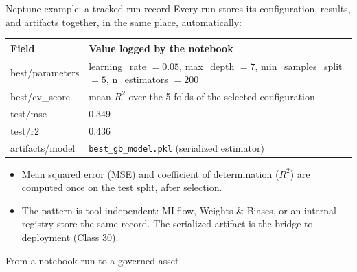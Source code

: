 \begin{frame}{Neptune example: a tracked run record}
\begingroup\footnotesize
Every run stores its configuration, results, and artifacts together, in the same place, automatically:
\par\endgroup
\vspace{0.4em}
\centering
\begingroup\footnotesize
\renewcommand{\arraystretch}{1.2}
\begin{tabularx}{0.9\textwidth}{>{\ttfamily}l X}
\normalfont\bfseries Field & \bfseries Value logged by the notebook \\
\toprule
best/parameters & learning\_rate $= 0.05$, max\_depth $= 7$, min\_samples\_split $= 5$, n\_estimators $= 200$ \\
best/cv\_score & mean $R^2$ over the 5 folds of the selected configuration \\
test/mse & 0.349 \\
test/r2 & 0.436 \\
artifacts/model & \texttt{best\_gb\_model.pkl} (serialized estimator) \\
\bottomrule
\end{tabularx}
\par\endgroup
\vspace{0.5em}
\begin{itemize}\footnotesize
\item Mean squared error (MSE) and coefficient of determination ($R^2$) are computed once on the test split, after selection.
\item The pattern is tool-independent: MLflow, Weights \& Biases, or an internal registry store the same record. The serialized artifact is the bridge to deployment (Class 30).
\end{itemize}
\coursefooter
\end{frame}

\begin{frame}{From a notebook run to a governed asset}
\centering
{}
\coursefooter
\end{frame}

